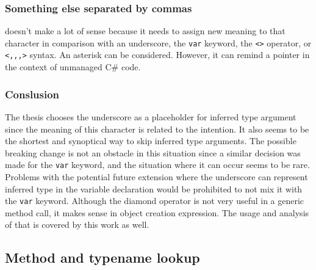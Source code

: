 \subsubsection{Something else separated by commas} 
doesn't make a lot of sense because it needs to assign new meaning to that character in comparison with an underscore, the \texttt{var} keyword, the \texttt{<>} operator, or \texttt{<,,,>} syntax. 
An asterisk can be considered.
However, it can remind a pointer in the context of unmanaged C\# code.

\subsubsection{Conslusion} 
The thesis chooses the underscore as a placeholder for inferred
type argument since the meaning of this character is related to the intention. 
It also seems to be the shortest and synoptical way to skip inferred type arguments. 
The possible breaking change is not an obstacle in this situation since a similar decision was made for the \texttt{var} keyword, and the situation where it can occur seems to be rare. 
Problems with the potential future extension where the underscore can represent inferred type in the variable declaration would be prohibited to not mix it with the \texttt{var} keyword. 
Although the diamond operator is not very useful in a generic method call, it makes sense in object creation expression. 
The usage and analysis of that is covered by this work as well.

\subsection{Method and typename lookup}

